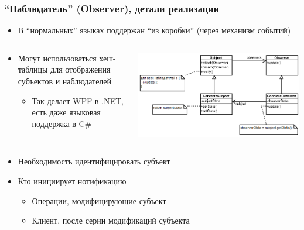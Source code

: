 \documentclass[xetex,mathserif,serif]{beamer}
\begin{document}
	\begin{frame}
		\frametitle{``Наблюдатель'' (Observer), детали реализации}
		\begin{itemize}
			\item В ``нормальных'' языках поддержан ``из коробки'' (через механизм событий)
		\end{itemize}
		\begin{columns}
			\begin{column}{0.45\textwidth}
				\begin{itemize}
					\item Могут использоваться хеш-таблицы для отображения субъектов и наблюдателей
					\begin{itemize}
						\item Так делает WPF в .NET, есть даже языковая поддержка в C\#
					\end{itemize}
				\end{itemize}
			\end{column}
			\begin{column}{0.55\textwidth}
				\begin{center}
					\includegraphics[width=\textwidth]{observer.png}
				\end{center}
			\end{column}
		\end{columns}
		\begin{itemize}
			\item Необходимость идентифицировать субъект
			\item Кто инициирует нотификацию
			\begin{itemize}
				\item Операции, модифицирующие субъект
				\item Клиент, после серии модификаций субъекта
			\end{itemize}
		\end{itemize}
	\end{frame}
\end{document}
